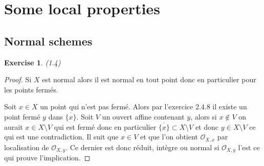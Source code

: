 \documentclass[A4, 11pt]{article}
\newtheorem{exer}{Exercise}
\begin{document}
 \section{Some local properties}
 \subsection{Normal schemes}
 \begin{exer}(1.4)
 \end{exer}
 \begin{proof}
 Si $X$ est normal alors il est normal en tout point donc en particulier pour les points fermés.
 
 Soit $x\in X$ un point qui n'est pas fermé. Alors par l'exercice 2.4.8 il existe un point fermé $y$ dans $\overline{\{x\}}$. Soit $V$ un ouvert affine contenant $y$, alors si $x\notin V$ on aurait $x\in X\setminus V$ qui est fermé donc en particulier $\overline{\{x\}}\subset X\setminus V$ et donc $y \in X\setminus V$ ce qui est une contradiction. Il suit que $x\in V$ et que l'on obtient $\mathcal{O}_{X,x}$ par localisation de $\mathcal{O}_{X,y}$. Ce dernier est donc réduit, intègre ou normal si $\mathcal{O}_{X,y}$ l'est ce qui prouve l'implication.
 \end{proof}
\end{document}
